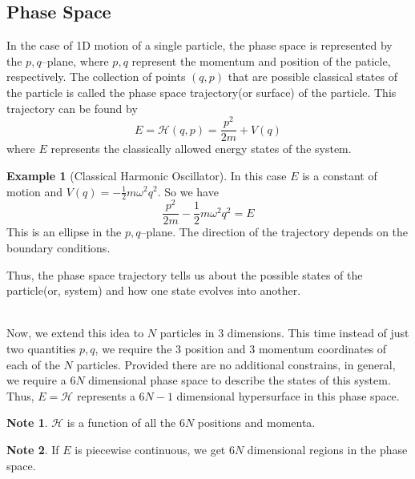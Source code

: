 \documentclass[10pt, a4paper]{extarticle}
\theoremstyle{definition}
\newtheorem{eg}{Example}
\newtheorem*{note*}{Note}
\begin{document}
\subsection{Phase Space}
In the case of 1D motion of a single particle, the phase space is represented by the $p,q$--plane, where $p,q$ represent the momentum and position of the paticle, respectively. The collection of points $(q,p)$ that are possible classical states of the particle is called the phase space trajectory(or surface) of the particle. This trajectory can be found by
\[E=\mathcal{H}(q,p)=\frac{p^2}{2m}+V(q)\]
where $E$ represents the classically allowed energy states of the system.
\begin{eg}[Classical Harmonic Oscillator]
	In this case $E$ is a constant of motion and $V(q)=-\frac{1}{2}m\omega^2q^2$. So we have
	\[\frac{p^2}{2m}-\frac{1}{2}m\omega^2q^2=E\]
	This is an ellipse in the $p,q$--plane. The direction of the trajectory depends on the boundary conditions.
\end{eg}
\begin{framed}
	Thus, the phase space trajectory tells us about the possible states of the particle(or, system) and how one state evolves into another.
\end{framed}
\hfill\\
Now, we extend this idea to $N$ particles in 3 dimensions. This time instead of just two quantities $p,q$, we require the 3 position and 3 momentum coordinates of each of the $N$ particles. Provided there are no additional constrains, in general, we require a $6N$ dimensional phase space to describe the states of this system. Thus, $E=\mathcal{H}$ represents a $6N-1$ dimensional hypersurface in this phase space.
\begin{note*}
	$\mathcal{H}$ is a function of all the $6N$ positions and momenta.
\end{note*}
\begin{note*}
	If $E$ is piecewise continuous, we get $6N$ dimensional regions in the phase space.
\end{note*}
\end{document}
